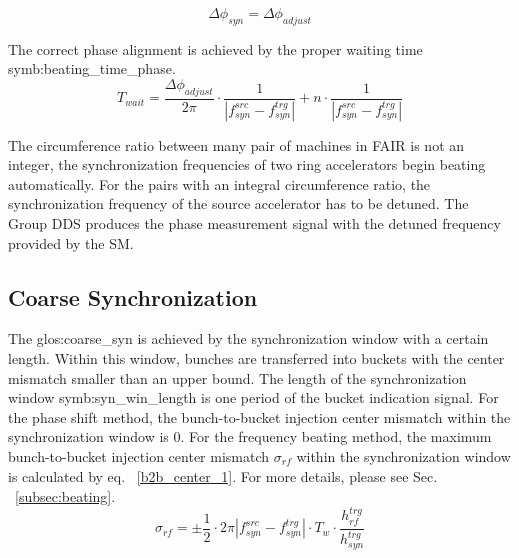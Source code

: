 \begin{equation}
\Delta \phi_\mathit{syn}=\Delta \phi_\mathit{adjust} 
\end{equation}

The correct phase alignment is achieved by the proper waiting time \gls{symb:beating_time_phase}.
\begin{equation}
T_\mathit{wait}= \frac{\Delta \phi_\mathit{adjust}}{2\pi}\cdot\frac{1}{|f_{\mathit{syn}}^\mathit{src}-f_{\mathit{syn}}^\mathit{trg}|}+n\cdot \frac{1}{|f_{\mathit{syn}}^\mathit{src}-f_{\mathit{syn}}^\mathit{trg}|}
\end{equation}

The circumference ratio between many pair of machines in FAIR is not an integer, the synchronization frequencies of two ring accelerators begin beating automatically. For the pairs with an integral circumference ratio, the synchronization frequency of the source accelerator has to be detuned. The Group DDS produces the phase measurement signal with the detuned frequency provided by the SM. 



\subsection{Coarse Synchronization}

The \gls{glos:coarse_syn} is achieved by the synchronization window with a certain length. Within this window, bunches are transferred into buckets with the center mismatch smaller than an upper bound. The length of the synchronization window \gls{symb:syn_win_length} is one period of the bucket indication signal. For the phase shift method, the bunch-to-bucket injection center mismatch within the synchronization window is $0$. For the frequency beating method, the maximum bunch-to-bucket injection center mismatch $\sigma_\mathit{rf}$ within the synchronization window is calculated by eq. ~\ref{b2b_center_1}. For more details, please see Sec. ~\ref{subsec:beating}.
\begin{equation}
\sigma_\mathit{rf}=\pm \frac{1}{2}\cdot 2\pi|f_{\mathit{syn}}^\mathit{src}-f_{\mathit{syn}}^\mathit{trg}|\cdot T_\mathit{w} \cdot \frac{h_{\mathit{rf}}^\mathit{trg}}{h_{\mathit{syn}}^\mathit{trg}}
\label{b2b_center_1}
\end{equation}

